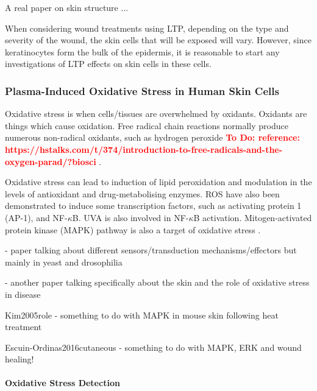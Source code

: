 \documentclass[11pt, oneside]{article}   	%
\newcommand{\todo}[1]{ \textcolor{red}{\bf{To Do:} #1}}
\begin{document}
A real paper on skin structure \cite{Mancini2014microRNAs}...

When considering wound treatments using LTP, depending on the type and severity of the wound, the skin cells that will be exposed will vary.
However, since keratinocytes form the bulk of the epidermis, it is reasonable to start any investigations of LTP effects on skin cells in these cells.



\subsubsection{Plasma-Induced Oxidative Stress in Human Skin Cells}

Oxidative stress is when cells/tissues are overwhelmed by oxidants. 
Oxidants are things which cause oxidation.
Free radical chain reactions normally produce numerous non-radical oxidants, such as hydrogen peroxide \todo{reference: https://hstalks.com/t/374/introduction-to-free-radicals-and-the-oxygen-parad/?biosci} .

Oxidative stress can lead to induction of lipid peroxidation and modulation in the levels of antioxidant and drug-metabolising enzymes.
ROS have also been demonstrated to induce some transcription factors, such as activating protein 1 (AP-1), and NF-$\kappa$B. 
UVA is also involved in NF-$\kappa$B activation.
Mitogen-activated protein kinase (MAPK) pathway is also a target of oxidative stress \cite{Bickers2006oxidative}.

\cite{Nadal2011controlling} - paper talking about different sensors/transduction mechanisms/effectors but mainly in yeast and drosophilia

\cite{Bickers2006oxidative} - another paper talking specifically about the skin and the role of oxidative stress in disease

Kim2005role - something to do with MAPK in mouse skin following heat treatment

Escuin-Ordinas2016cutaneous - something to do with MAPK, ERK and wound healing!

\paragraph{Oxidative Stress Detection}
\end{document}
